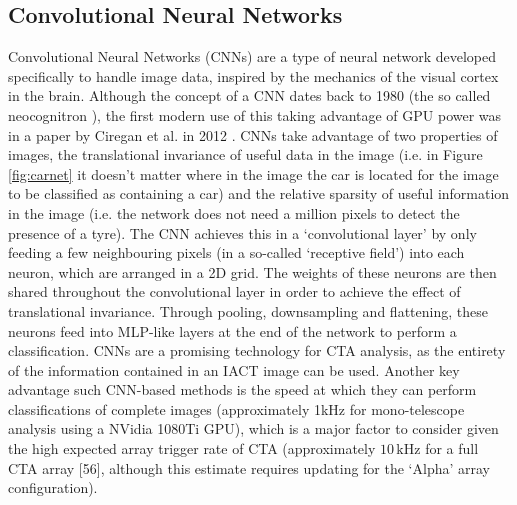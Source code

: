\subsection{Convolutional Neural Networks}
Convolutional Neural Networks (CNNs) are a type of neural network developed specifically to handle image data, inspired by the mechanics of the visual cortex in the brain. Although the concept of a CNN dates back to 1980 (the so called neocognitron \cite{neocongnitron}), the first modern use of this taking advantage of GPU power was in a paper by Ciregan et al. in 2012 \cite{ciregan}. CNNs take advantage of two properties of images, the translational invariance of useful data in the image (i.e. in Figure \ref{fig:carnet} it doesn't matter where in the image the car is located for the image to be classified as containing a car) and the relative sparsity of useful information in the image (i.e. the network does not need a million pixels to detect the presence of a tyre). The CNN achieves this in a `convolutional layer' by only feeding a few neighbouring pixels (in a so-called `receptive field') into each neuron, which are arranged in a 2D grid. The weights of these neurons are then shared throughout the convolutional layer in order to achieve the effect of translational invariance. Through pooling, downsampling and flattening, 
these neurons feed into MLP-like layers at the end of the network to perform a classification. CNNs are a promising technology for CTA analysis, as the entirety of the information contained in an IACT image can be used. Another key advantage such CNN-based methods is the speed at which they can perform classifications of complete images (approximately 1kHz for mono-telescope analysis using a NVidia 1080Ti GPU), which is a major factor to consider given the high expected array trigger rate of CTA (approximately $\mathrm{10\,kHz}$ for a full CTA array [56], although this estimate requires updating for the `Alpha' array configuration).

